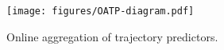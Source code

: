 
\begin{figure}[h]
    \begin{minipage}{\textwidth}
        \texttt{[image: figures/OATP-diagram.pdf]}
    \end{minipage}
     \caption{Online aggregation of trajectory predictors.}
    \label{fig:diagram}
\end{figure}